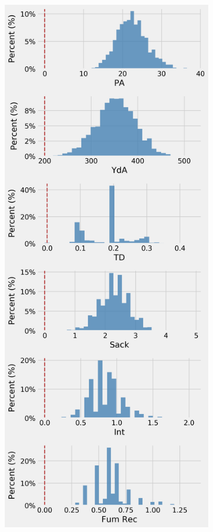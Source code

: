 \documentclass[12pt]{article}
\begin{document}
\pagebreak
\begin{figure}[H]
  \centering
  \begin{subfigure}[b]{0.450\textwidth}
    \centering
    \includegraphics[width=1\textwidth]{../figures/no_threshold_hist_DST}

\end{subfigure}
\end{figure}
\end{document}
